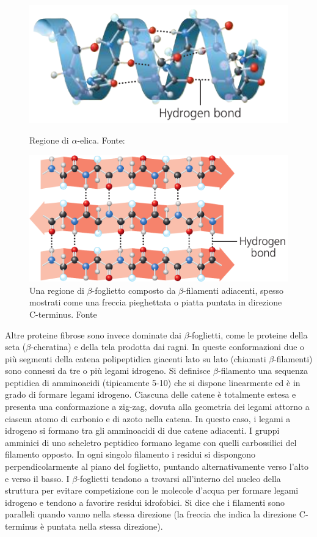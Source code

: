 {{\begin{figure}[!htb]
	\includegraphics[scale=0.34]{images/eliche.png}
	\caption{Regione di $\alpha$-elica. Fonte: \cite{campbell}}
	\label{fig:eliche}
	\endminipage\hfill
	\centering
	\includegraphics[scale=0.31]{images/foglietti.png}
	\caption{Una regione di $\beta$-foglietto composto da $\beta$-filamenti adiacenti, spesso mostrati come una freccia pieghettata o piatta puntata in direzione C-terminus. Fonte \cite{campbell}}
	\label{fig:foglietti}
	\endminipage\hfill
\end{figure}

Altre proteine fibrose sono invece dominate dai $\beta$-foglietti, come le proteine della seta ($\beta$-cheratina) e della tela prodotta dai ragni. In queste conformazioni due o più segmenti della catena polipeptidica giacenti lato su lato (chiamati $\beta$-filamenti) sono connessi da tre o più legami idrogeno. Si definisce $\beta$-filamento una sequenza peptidica di amminoacidi (tipicamente 5-10) che si dispone linearmente ed è in grado di formare legami idrogeno. Ciascuna delle catene è totalmente estesa e presenta una conformazione a zig-zag, dovuta alla geometria dei legami attorno a ciascun atomo di carbonio e di azoto nella catena. In questo caso, i legami a idrogeno si formano tra gli amminoacidi di due catene adiacenti. I gruppi amminici di uno scheletro peptidico formano legame con quelli carbossilici del filamento opposto. In ogni singolo filamento i residui si dispongono perpendicolarmente al piano del foglietto, puntando alternativamente verso l'alto e verso il basso. I $\beta$-foglietti tendono a trovarsi all'interno del nucleo della struttura per evitare competizione con le molecole d'acqua per formare legami idrogeno e tendono a favorire residui idrofobici. Si dice che i filamenti sono paralleli quando vanno nella stessa direzione (la freccia che indica la direzione C-terminus è puntata nella stessa direzione).


}}
